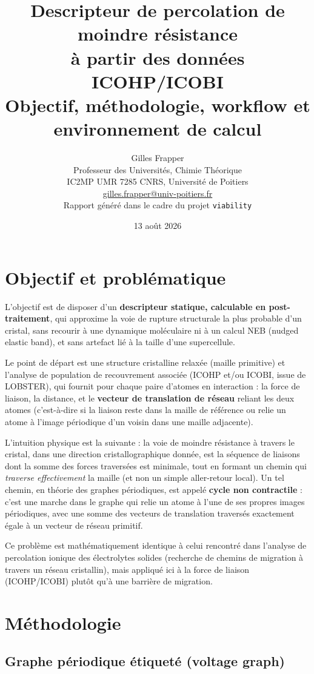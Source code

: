 \documentclass[11pt,a4paper]{article}
\title{\bfseries Descripteur de percolation de moindre résistance \\
à partir des données ICOHP/ICOBI \\
\large Objectif, méthodologie, workflow et environnement de calcul}
\author{Gilles Frapper \\ Professeur des Universités, Chimie Théorique \\ IC2MP UMR 7285 CNRS, Université de Poitiers \\ \href{mailto:gilles.frapper@univ-poitiers.fr}{gilles.frapper@univ-poitiers.fr}\\[4pt] \small Rapport généré dans le cadre du projet \texttt{viability}}
\date{13 août 2026}
\begin{document}
\maketitle

\tableofcontents
\newpage

\section{Objectif et problématique}

L'objectif est de disposer d'un \textbf{descripteur statique, calculable en
post-traitement}, qui approxime la voie de rupture structurale la plus
probable d'un cristal, sans recourir à une dynamique moléculaire ni à un
calcul NEB (nudged elastic band), et sans artefact lié à la taille d'une
supercellule.

Le point de départ est une structure cristalline relaxée (maille primitive)
et l'analyse de population de recouvrement associée (ICOHP et/ou ICOBI,
issue de LOBSTER), qui fournit pour chaque paire d'atomes en interaction :
la force de liaison, la distance, et le \textbf{vecteur de translation de
réseau} reliant les deux atomes (c'est-à-dire si la liaison reste dans la
maille de référence ou relie un atome à l'image périodique d'un voisin dans
une maille adjacente).

L'intuition physique est la suivante : la voie de moindre résistance à
travers le cristal, dans une direction cristallographique donnée, est la
séquence de liaisons dont la somme des forces traversées est minimale, tout
en formant un chemin qui \emph{traverse effectivement} la maille (et non un
simple aller-retour local). Un tel chemin, en théorie des graphes
périodiques, est appelé \textbf{cycle non contractile} : c'est une marche
dans le graphe qui relie un atome à l'une de ses propres images
périodiques, avec une somme des vecteurs de translation traversés
exactement égale à un vecteur de réseau primitif.

Ce problème est mathématiquement identique à celui rencontré dans
l'analyse de percolation ionique des électrolytes solides (recherche de
chemins de migration à travers un réseau cristallin), mais appliqué ici à
la force de liaison (ICOHP/ICOBI) plutôt qu'à une barrière de migration.

\section{Méthodologie}

\subsection{Graphe périodique étiqueté (voltage graph)}
\end{document}
